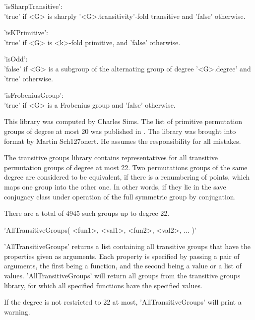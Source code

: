 'isSharpTransitive': \\
        'true' if <G> is sharply '<G>.transitivity'-fold  transitive  and
        'false' otherwise.

'isKPrimitive': \\
        'true' if <G> is <k>-fold primitive, and 'false' otherwise.

'isOdd': \\
        'false' if <G> is a subgroup of the alternating  group  of degree
        '<G>.degree' and 'true' otherwise.

'isFrobeniusGroup': \\
        'true' if <G> is a  Frobenius group    and
        'false' otherwise.

This  library  was  computed  by  Charles Sims.   The  list  of primitive
permutation groups  of  degree  at most 20 was published in \cite{Sim70}.
The    library   was    brought    into   {\GAP}    format    by   Martin
Sch{\accent127o}nert.  He assumes the responsibility for all mistakes.

\newpage
{}

The transitive groups library contains representatives for all transitive
permutation groups of degree at most  22.  Two permutations groups of the
same degree are considered to be equivalent, if there is a renumbering of
points, which maps one group into the other one.  In other words, if they
lie in the save  conjugacy class  under operation  of the  full symmetric
group by conjugation.

There are a total of 4945 such groups up to degree 22.

\vspace{5mm}
'AllTransitiveGroups( <fun1>, <val1>, <fun2>, <val2>, ... )'

'AllTransitiveGroups' returns   a list containing   all transitive groups
that have the properties given as arguments.   Each property is specified
by  passing a pair   of arguments, the   first being a function, and  the
second being a   value or a  list of  values.  'AllTransitiveGroups' will
return  all groups  from the  transitive  groups  library, for which  all
specified functions have the specified values.

If the degree is not restricted to 22 at most, 'AllTransitiveGroups' will
print a warning.

